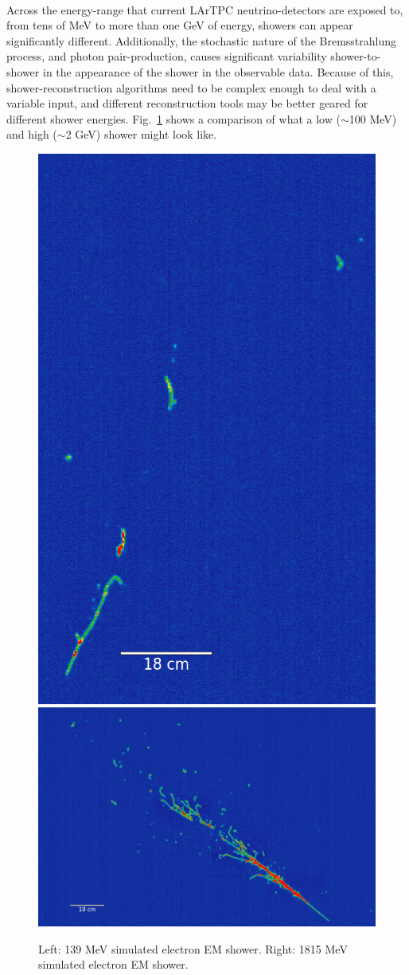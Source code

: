 \paragraph{}Across the energy-range that current LArTPC neutrino-detectors are exposed to, from tens of MeV to more than one GeV of energy, showers can appear significantly different. Additionally, the stochastic nature of the Bremsstrahlung process, and photon pair-production, causes significant variability shower-to-shower in the appearance of the shower in the observable data. Because of this, shower-reconstruction algorithms need to be complex enough to deal with a variable input, and different reconstruction tools may be better geared for different shower energies. Fig.~\ref{fig:emshower_sim} shows a comparison of what a low ($\sim$100 MeV) and high ($\sim$2 GeV) shower might look like.
\begin{figure}[H]
\centering
\includegraphics[height=0.45\textwidth]{figures/raw_sim_eminus_139MeV.png}
\includegraphics[height=0.45\textwidth]{figures/raw_sim_eminus_1815MeV.png}
\caption{Left: 139 MeV simulated electron EM shower. Right: 1815 MeV simulated electron EM shower.}
\label{fig:emshower_sim}
\end{figure}
